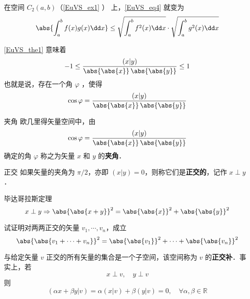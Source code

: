 \begin{example}{}
在空间 $C_2(a,b)$（\autoref{EuVS_ex1} ） 上，\autoref{EuVS_eq4} 就变为
\begin{equation}
\abs{\int_a^b f(x)g(x)\dd x}\leq\sqrt{\int_a^b f^2(x)\dd x}\cdot\sqrt{\int_a^b g^2(x)\dd x}
\end{equation}
\end{example}
\autoref{EuVS_the1} 意味着
\begin{equation}
-1\leq\frac{( x| y)}{\abs{\abs{ x}}\,\abs{\abs{y}}}\leq1
\end{equation}
也就是说，存在一个角 $\varphi$ ，使得
\begin{equation}
\cos\varphi=\frac{( x| y)}{\abs{\abs{ x}}\,\abs{\abs{ y}}}
\end{equation}
\begin{definition}{夹角}\label{EuVS_def3}
欧几里得矢量空间中，由
\begin{equation}
\cos\varphi=\frac{( x| y)}{\abs{\abs{ x}}\,\abs{\abs{ y}}}
\end{equation}
确定的角 $\varphi$ 称之为矢量 $x$ 和 $y$ 的\textbf{夹角}． 
\end{definition}
\begin{definition}{正交}
如果矢量的夹角为 $\pi/2$，亦即 $( x| y)=0$，则称它们是\textbf{正交的}，记作 $ x\perp y$．
\end{definition}
\begin{theorem}{毕达哥拉斯定理}
\begin{equation}
x\perp y\Rightarrow\abs{\abs{ x+ y}}^2=\abs{\abs{ x}}^2+\abs{\abs{ y}}^2
\end{equation}
\end{theorem}
\begin{exercise}{}
试证明对两两正交的矢量 $v_1,\cdots, v_n$，成立
\begin{equation}
\abs{\abs{ v_1+\cdots+ v_n}}^2=\abs{\abs{ v_1}}^2+\cdots+\abs{\abs{ v_n}}^2
\end{equation}
\end{exercise}
\begin{example}{}
与给定矢量 $v$ 正交的所有矢量的集合是一个子空间，该空间称为 $v$ 的\textbf{正交补}．事实上，若
\begin{equation}
 x\perp v,\quad y\perp v
\end{equation}
则
\begin{equation}
(\alpha x+\beta y| v)=\alpha( x| v)+\beta( y| v)=0,\quad \forall\alpha,\beta\in\mathbb R
\end{equation}
\end{example}
